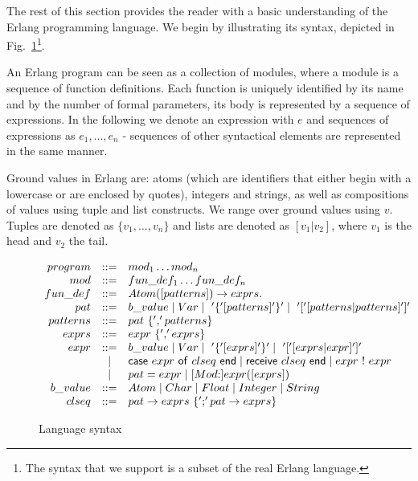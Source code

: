 \documentclass{article}[12pt,a4paper]
\theoremstyle{definition}
\newcommand{\cons}{\mbox{:}}
\begin{document}
The rest of this section provides the reader with a basic understanding
of the Erlang programming language. We begin by illustrating its syntax, depicted in
Fig.~\ref{ErlangSyntax}\footnote{The syntax that we support is a subset of the
  real Erlang language.}. 

An Erlang program can be seen as a collection of modules, where a module is a sequence of function definitions. Each function is uniquely identified by its name and by the
number of formal parameters, its body is represented
by a sequence of expressions. In the following we denote an expression with $e$
and sequences of expressions as $e_1,\ldots,e_n$  - sequences of other
syntactical elements are represented in the same manner. 

Ground values in Erlang are: atoms (which are identifiers that either
begin with a lowercase or are enclosed by quotes), integers and
strings, as well as compositions of values using tuple and list
constructs. We range over ground values using $v$. Tuples are denoted
as $\{v_1,\ldots,v_n\}$ and lists are denoted as
$[v_1|v_2]$, where $v_1$ is the head and $v_2$ the tail.


\begin{figure}[t]
  \begin{center}
    $
    \begin{array}{rcl@{~~~~~~}l}

      program & ::= & mod_1  \dots  mod_n \\
      mod & ::= & fun\_def_1  \dots fun\_def_n  \\
      fun\_def & ::= & Atom([patterns]) \to exprs.\\
      pat & ::= & b\_value \mid Var \mid ~'\{'[patterns]'\}' \mid ~
                  '['[patterns|patterns] ']'\\
      patterns & ::= & pat ~\{ ','patterns\} \\
      exprs & ::= & expr ~\{ ',' exprs\} \\
      expr & ::= & b\_value \mid Var \mid ~'\{'[exprs]'\}' \mid ~'[' [exprs|expr] ']' \\
                    & \mid & \ms{case}~expr~\ms{of}~clseq~\mathsf{end} \mid
                             \ms{receive}~clseq~\mathsf{end} \mid expr ~ ! ~ expr \\
                    & \mid & pat = expr \mid
                             [Mod\cons]expr([exprs]) \\
      b\_value & ::= & Atom \mid Char \mid Float \mid Integer \mid String \\
      clseq & ::= & pat  \to exprs ~ \{ ';' pat \to exprs  \} \\
    \end{array}
    $
  \end{center}
  \caption{Language syntax} \label{ErlangSyntax}
\end{figure}
\end{document}

